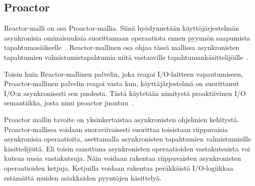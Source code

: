 \documentclass[finnish]{tktltiki2}
\theoremstyle{definition}
\theoremstyle{remark}
\begin{document}
\subsection{Proactor}

Reactor-malli on osa Proactor-mallia.
Siinä hyödynnetään käyttöjärjestelmän asynkronisia ominaisuuksia suorittamaan
operaatiota ennen pyynnön saapumista tapahtumasäikeelle~\cite{pyarali_proactor_1997}.
Reactor-mallinen osa ohjaa tässä mallissa asynkronisten tapahtumien
valmistumistapahtumia niitä vastaaville tapahtumankäsittelijöille~\cite{pyarali_proactor_1997}.

Toisin kuin Reactor-mallinen palvelin, joka reagoi I/O-laitteen vapautumiseen,
Proactor-mallinen palvelin reagoi vasta kun, käyttäjärjestelmä
on suorittanut I/O:n asynkronisesti sen puolesta. Tästä käytetään nimitystä
proaktiivinen I/O semantiikka, josta nimi proactor juontuu~\cite{pyarali_proactor_1997}.

Proactor mallin tavoite on yksinkertaistaa asynkronisten ohjelmien kehitystä.
Proactor-mallissa voidaan suoraviivaisesti suorittaa toisistaan riippuvaisia
asynkronisia operaatioita, asettamalla asynkronisten tapahtumien valmistumisille
käsittelijöitä. Eli toisin sanottuna asynkronisten operaatioiden vastakutsuista
voi kutsua uusia vastakutsuja. Näin voidaan rakentaa riippuvaisten
asynkronisten operaatioiden ketjuja. Ketjuilla voidaan
rakentaa peräkkäistä I/O-logiikkaa estämättä muiden asiakkaiden
pyyntöjen käsittelyä.
\end{document}
